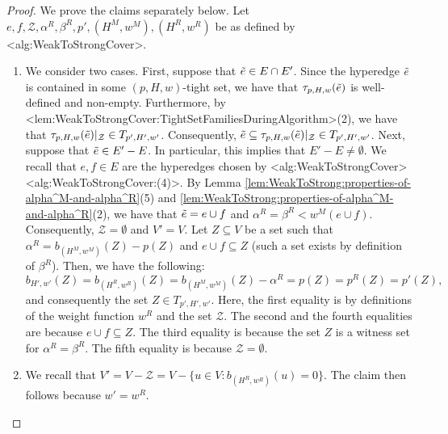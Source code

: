 \documentclass{article}
\def\Cref#1{<#1>}%
\newcommand{\zeros}{\ensuremath{\mathcal{Z}}\xspace}
\newcommand{\maximalTightSetFamily}[1]{\ensuremath{\calT_{#1}}\xspace}
\newcommand{\tightSetFamily}[1]{\ensuremath{T_{#1}}\xspace}
\newcommand{\shubhang}[1]{{\color{blue}[{\tiny Shubhang: \bf #1}]\marginpar{\color{blue}*}}}
\newcommand{\knote}[1]{{\color{red}[{\tiny Karthik: \bf #1}]\marginpar{\color{red}*}}}
\newcommand{\maximalTightSetContainingHyperedge}[1]{\ensuremath{\tau_{#1}}\xspace}
\providecommand{\calT}{\mathcal{T}}
\begin{document}
\begin{proof} We prove the claims separately below. Let $e, f, \zeros, \alpha^R, \beta^R, p', (H^M, w^M), (H^R, w^R)$ be as defined by \Cref{alg:WeakToStrongCover}.
\begin{enumerate}
    \item We consider two cases. First, suppose that $\Tilde{e} \in E \cap E'$. Since the hyperedge $\Tilde{e}$ is contained in some $(p, H, w)$-tight set, we have that $\maximalTightSetContainingHyperedge{p, H, w}(\Tilde{e})$ is well-defined and non-empty. Furthermore, by \Cref{lem:WeakToStrongCover:TightSetFamiliesDuringAlgorithm}(2), we have that $\maximalTightSetContainingHyperedge{p, H, w}(\Tilde{e})|_{\zeros} \in \tightSetFamily{p', H', w'}$. Consequently, $\Tilde{e} \subseteq \maximalTightSetContainingHyperedge{p, H, w}(\Tilde{e})|_{\zeros} \in \tightSetFamily{p', H', w'}$. Next, suppose that $\Tilde{e} \in E' - E$. In particular, this implies that $E' - E \not= \emptyset$. 
    We recall that $e, f \in E$ are the hyperedges chosen by  \Cref{alg:WeakToStrongCover}  \Cref{alg:WeakToStrongCover:(4)}. 
    By Lemma \ref{lem:WeakToStrong:properties-of-alpha^M-and-alpha^R}(5) and \ref{lem:WeakToStrong:properties-of-alpha^M-and-alpha^R}(2), we have that $\Tilde{e} = e\cup f$ and $\alpha^R = \beta^R < w^M(e \cup f)$. Consequently, $\zeros = \emptyset$ and $V' = V$. Let $Z \subseteq V$ be a set such that 
    $\alpha^R = b_{(H^M, w^M)}(Z) - p(Z)$ and $e\cup f \subseteq Z$ (such a set exists by definition of $\beta^R$).
    Then, we have the following: 
    $$b_{H',w'}(Z) = b_{(H^R, w^R)}(Z) = b_{(H^M, w^M)}(Z) - \alpha^R = p(Z) = p^R(Z) = p'(Z),$$
    and consequently the set $Z \in \tightSetFamily{p', H', w'}$.
    Here, the first equality is by definitions of the weight function $w^R$ and the set $\zeros$. The second and the fourth equalities are because $e \cup f \subseteq Z$. The third equality is because the set $Z$ is a witness set for $\alpha^R = \beta^R$. 
    The fifth equality is because $\zeros = \emptyset$.  %

    \item We recall that $V' = V - \zeros = V - \{u\in V : b_{(H^R, w^R)}(u) = 0\}$. The claim then follows because $w' = w^R$. 
    
\end{enumerate}
\end{proof}
\end{document}
